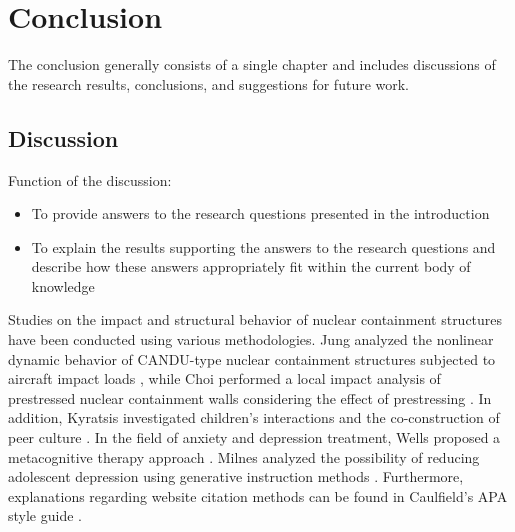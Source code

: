 \chapter{Conclusion}

The conclusion generally consists of a single chapter and includes discussions of the research results, conclusions, and suggestions for future work.

\section{Discussion}

Function of the discussion:
\begin{itemize}[leftmargin=3em, itemsep=2pt]
  \item To provide answers to the research questions presented in the introduction
  \item To explain the results supporting the answers to the research questions and describe how these answers appropriately fit within the current body of knowledge
\end{itemize}

Studies on the impact and structural behavior of nuclear containment structures have been conducted using various methodologies.
Jung analyzed the nonlinear dynamic behavior of CANDU-type nuclear containment structures subjected to aircraft impact loads \cite{jung2002},
while Choi performed a local impact analysis of prestressed nuclear containment walls considering the effect of prestressing \cite{choi2014}.
In addition, Kyratsis investigated children's interactions and the co-construction of peer culture \cite{kyratsis2004}.
In the field of anxiety and depression treatment, Wells proposed a metacognitive therapy approach \cite{wells2009a,wells2009b,wells2010}.
Milnes analyzed the possibility of reducing adolescent depression using generative instruction methods \cite{milnes1998}.
Furthermore, explanations regarding website citation methods can be found in Caulfield’s APA style guide \cite{caulfield2020}.